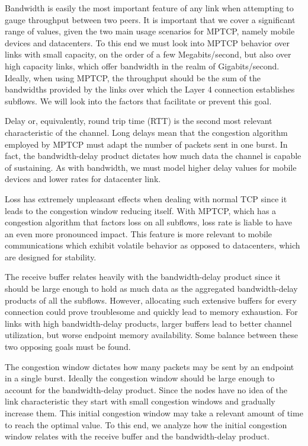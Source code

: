 
Bandwidth is easily the most important feature of any link when attempting to
gauge throughput between two peers. It is important that we cover a significant
range of values, given the two main usage scenarios for MPTCP, namely mobile
devices and datacenters. To this end we must look into MPTCP behavior over
links with small capacity, on the order of a few Megabits/second, but also
over high capacity links, which offer bandwidth in the realm of
Gigabits/second. Ideally, when using MPTCP, the throughput should be the sum
of the bandwidths provided by the links over which the Layer 4 connection
establishes subflows. We will look into the factors that facilitate or prevent
this goal.

Delay or, equivalently, round trip time (RTT) is the second most relevant
characteristic of the channel. Long delays mean that the congestion algorithm
employed by MPTCP must adapt the number of packets sent in one burst. In fact,
the bandwidth-delay product dictates how much data the channel is capable of
sustaining. As with bandwidth, we must model higher delay values for mobile
devices and lower rates for datacenter link.

Loss has extremely unpleasant effects when dealing with normal TCP since it
leads to the congestion window reducing itself. With MPTCP, which has a
congestion algorithm that factors loss on all subflows, loss rate is liable to
have an even more pronounced impact. This feature is more relevant to mobile
communications which exhibit volatile behavior as opposed to datacenters, which
are designed for stability.

The receive buffer relates heavily with the bandwidth-delay product since it
should be large enough to hold as much data as the aggregated bandwidth-delay
products of all the subflows. However, allocating such extensive buffers for
every connection could prove troublesome and quickly lead to memory
exhaustion. For links with high bandwidth-delay products, larger buffers lead
to better channel utilization, but worse endpoint memory availability. Some
balance between these two opposing goals must be found.

The congestion window dictates how many packets may be sent by an endpoint in
a single burst. Ideally the congestion window should be large enough to
account for the bandwidth-delay product. Since the nodes have no idea of the
link characteristic they start with small congestion windows and gradually
increase them. This initial congestion window may take a relevant amount of
time to reach the optimal value. To this end, we analyze how the initial
congestion window relates with the receive buffer and the bandwidth-delay
product.
